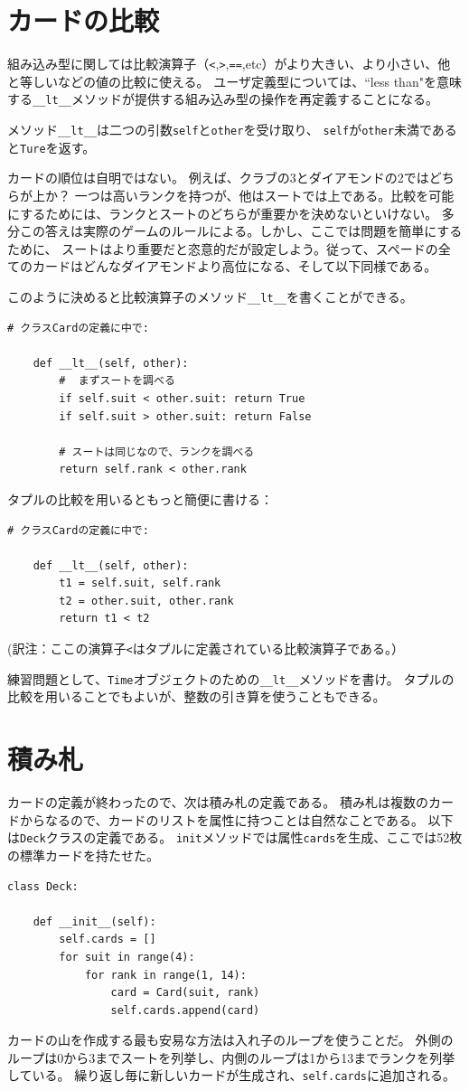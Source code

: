 \documentclass[a4j,12pt,makeidx]{jbook}
\begin{document}
\section{カードの比較}
組み込み型に関しては比較演算子（{\tt <},{\tt >},{\tt ==},etc）がより大きい、より小さい、他と等しいなどの値の比較に使える。
ユーザ定義型については、``less than"を意味する{\verb"__lt__"}メソッドが提供する組み込み型の操作を再定義することになる。\par
メソッド{\verb"__lt__"}は二つの引数{\tt self}と{\tt other}を受け取り、
{\tt self}が{\tt other}未満であると{\tt Ture}を返す。\par
カードの順位は自明ではない。
例えば、クラブの3とダイアモンドの2ではどちらが上か？
一つは高いランクを持つが、他はスートでは上である。比較を可能にするためには、ランクとスートのどちらが重要かを決めないといけない。
多分この答えは実際のゲームのルールによる。しかし、ここでは問題を簡単にするために、
スートはより重要だと恣意的だが設定しよう。従って、スペードの全てのカードはどんなダイアモンドより高位になる、そして以下同様である。\par
このように決めると比較演算子のメソッド{\verb"__lt__"}を書くことができる。
\begin{verbatim}
# クラスCardの定義に中で:

    def __lt__(self, other):
        #  まずスートを調べる
        if self.suit < other.suit: return True
        if self.suit > other.suit: return False

        # スートは同じなので、ランクを調べる
        return self.rank < other.rank
\end{verbatim}
タプルの比較を用いるともっと簡便に書ける：
\begin{verbatim}
# クラスCardの定義に中で:

    def __lt__(self, other):
        t1 = self.suit, self.rank
        t2 = other.suit, other.rank
        return t1 < t2
\end{verbatim}
(訳注：ここの演算子{\tt <}はタプルに定義されている比較演算子である。）\par
練習問題として、{\tt Time}オブジェクトのための{\verb"__lt__"}メソッドを書け。
タプルの比較を用いることでもよいが、整数の引き算を使うこともできる。
%
\section{積み札}
カードの定義が終わったので、次は積み札の定義である。
積み札は複数のカードからなるので、カードのリストを属性に持つことは自然なことである。
以下は{\tt Deck}クラスの定義である。
{\tt init}メソッドでは属性{\tt cards}を生成、ここでは52枚の標準カードを持たせた。
\begin{verbatim}
class Deck:

    def __init__(self):
        self.cards = []
        for suit in range(4):
            for rank in range(1, 14):
                card = Card(suit, rank)
                self.cards.append(card)
\end{verbatim}
カードの山を作成する最も安易な方法は入れ子のループを使うことだ。
外側のループは0から3までスートを列挙し、内側のループは1から13までランクを列挙している。
繰り返し毎に新しいカードが生成され、{\tt self.cards}に追加される。
%
\end{document}
